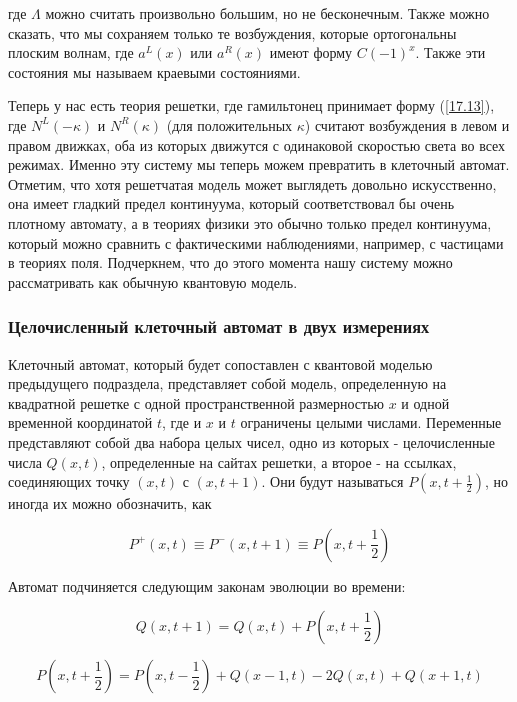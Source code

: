 \documentclass[main.tex]{subfiles}
\begin{document}
где $\Lambda$ можно считать произвольно большим, но не бесконечным. Также можно сказать, что мы сохраняем только те возбуждения, которые ортогональны плоским волнам, где $a^{L}(x)$ или $a^{R}(x)$ имеют форму $C(-1)^{x}$. Также эти состояния мы называем краевыми состояниями.

Теперь у нас есть теория решетки, где гамильтонец принимает форму (\ref{17.13}), где $N^{L}(-\kappa)$ и $N^{R}(\kappa)$ (для положительных $\kappa$) считают возбуждения в левом и правом движках, оба из которых движутся с одинаковой скоростью света во всех режимах. Именно эту систему мы теперь можем превратить в клеточный автомат. Отметим, что хотя решетчатая модель может выглядеть довольно искусственно, она имеет гладкий предел континуума, который соответствовал бы очень плотному автомату, а в теориях физики это обычно только предел континуума, который можно сравнить с фактическими наблюдениями, например, с частицами в теориях поля. Подчеркнем, что до этого момента нашу систему можно рассматривать как обычную квантовую модель.




\subsubsection{Целочисленный клеточный автомат в двух измерениях}\label{ch17.1.2}

Клеточный автомат, который будет сопоставлен с квантовой моделью предыдущего подраздела, представляет собой модель, определенную на квадратной решетке с одной пространственной размерностью $x$ и одной временной координатой $t$, где и $x$ и $t$ ограничены целыми числами. Переменные представляют собой два набора целых чисел, одно из которых - целочисленные числа $Q(x, t)$, определенные на сайтах решетки, а второе - на ссылках, соединяющих точку $(x, t)$ с $(x, t+1)$. Они будут называться $P\left(x, t + \frac{1}{2} \right)$, но иногда их можно обозначить, как

\begin{equation}\label{17.37}
P^{+}(x, t) \equiv P^{-}(x, t+1) \equiv P\left(x, t+\frac{1}{2}\right)
\end{equation}

Автомат подчиняется следующим законам эволюции во времени:

\begin{equation}\label{17.38}
Q(x, t+1)=Q(x, t)+P\left(x, t+\frac{1}{2}\right)
\end{equation}

\begin{equation}\label{17.39}
P\left(x, t+\frac{1}{2}\right)=P\left(x, t-\frac{1}{2}\right)+Q(x-1, t)-2 Q(x, t)+Q(x+1, t)
\end{equation}
\end{document}
